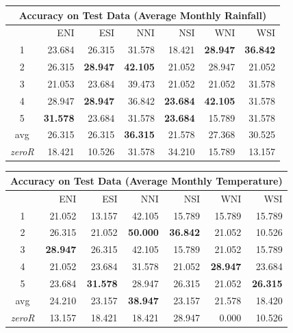 \documentclass[11pt,a4paper, titlepage]{article}
\begin{document}
\begin{center}
\begin{tabular}{|c | r | r | r | r | r | r|}
\hline
\multicolumn{7}{|c|}{Accuracy on Test Data (Average Monthly Rainfall)} \\
\hline
 & ENI & ESI & NNI & NSI & WNI & WSI\\
\hline
1 & 23.684 & 26.315 & 31.578 & 18.421 & \bf28.947 & \bf{36.842} \\
2 & 26.315 & \bf{28.947} & \bf{42.105} & 21.052 & 28.947 & 21.052 \\
3 & 21.053 & 23.684 & 39.473 & 21.052 & 21.052 & 31.578 \\
4 & 28.947 & \bf{28.947} & 36.842 & \bf{23.684} & \bf{42.105} & 31.578 \\
5 & \bf{31.578} & 23.684 & 31.578 & \bf{23.684} & 15.789 & 31.578 \\
\hline
avg & 26.315 & 26.315 & \bf{36.315} & 21.578 & 27.368 & 30.525 \\
\hline
\it{zeroR} & 18.421 & 10.526 & 31.578 & 34.210 & 15.789 & 13.157 \\
\hline
\end{tabular}

\vspace{1cm}

\begin{tabular}{|c | r | r | r | r | r | r|}
\hline
\multicolumn{7}{|c|}{Accuracy on Test Data (Average Monthly Temperature)} \\
\hline
 & ENI & ESI & NNI & NSI & WNI & WSI\\
\hline

1 & 21.052 & 13.157 & 42.105 & 15.789 & 15.789 & 15.789 \\
2 & 26.315 & 21.052 & \bf{50.000} & \bf{36.842} & 21.052 & 10.526 \\
3 & \bf{28.947} & 26.315 & 42.105 & 15.789 & 21.052 & 15.789 \\
4 & 21.052 & 23.684 & 31.578 & 21.052 & \bf{28.947} & 23.684 \\
5 & 23.684 & \bf{31.578} & 28.947 & 26.315 & 21.052 & \bf{26.315} \\
\hline
avg & 24.210 & 23.157 & \bf{38.947} & 23.157 & 21.578 & 18.420 \\
\hline
\it{zeroR} & 13.157 & 18.421 & 18.421 & 28.947 & 0.000 & 10.526 \\
\hline
\end{tabular}
\end{center}
\end{document}

